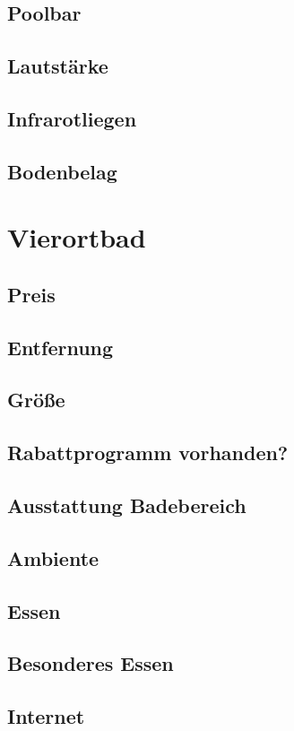 \documentclass{article}
\begin{document}
\subsection*{Poolbar}
\subsection*{Lautstärke}
\subsection*{Infrarotliegen}
\subsection*{Bodenbelag}
\pagebreak

\section*{Vierortbad}
\subsection*{Preis}
\subsection*{Entfernung}
\subsection*{Größe}
\subsection*{Rabattprogramm vorhanden?}
\subsection*{Ausstattung Badebereich}
\subsection*{Ambiente}
\subsection*{Essen}
\subsection*{Besonderes Essen}
\subsection*{Internet}
\end{document}
